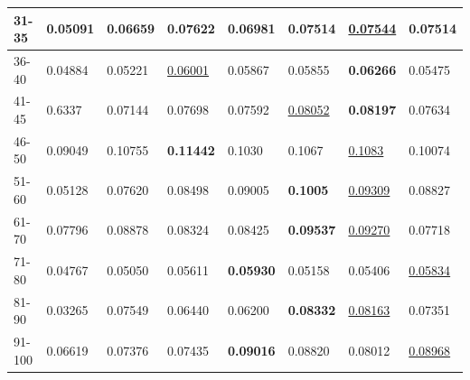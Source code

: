\begin{table}[]
\begin{tabular}{|l|l|l|l|l|l|l||l|}
        31-35       & 0.05091                        & 0.06659                        & \textbf{0.07622}               & 0.06981                        & 0.07514                        & \underline{0.07544}             & 0.07514                    \\ \hline
        36-40       & 0.04884                        & 0.05221                        & \underline{0.06001}            & 0.05867                        & 0.05855                        & \textbf{0.06266}                & 0.05475                    \\ \hline
        41-45       & 0.6337                         & 0.07144                        & 0.07698                        & 0.07592                        & \underline{0.08052}            & \textbf{0.08197}                & 0.07634                    \\ \hline
        46-50       & 0.09049                        & 0.10755                        & \textbf{0.11442}               & 0.1030                         & 0.1067                         & \underline{0.1083}              & 0.10074                    \\ \hline
        51-60       & 0.05128                        & 0.07620                        & 0.08498                        & 0.09005                        & \textbf{0.1005}                & \underline{0.09309}             & 0.08827                    \\ \hline
        61-70       & 0.07796                        & 0.08878                        & 0.08324                        & 0.08425                        & \textbf{0.09537}               & \underline{0.09270}             & 0.07718                    \\ \hline
        71-80       & 0.04767                        & 0.05050                        & 0.05611                        & \textbf{0.05930}               & 0.05158                        & 0.05406                         & \underline{0.05834}        \\ \hline
        81-90       & 0.03265                        & 0.07549                        & 0.06440                        & 0.06200                        & \textbf{0.08332}               & \underline{0.08163}             & 0.07351                    \\ \hline
        91-100      & 0.06619                        & 0.07376                        & 0.07435                        & \textbf{0.09016}               & 0.08820                        & 0.08012                         & \underline{0.08968}        \\ \hline

\end{tabular}
\end{table}
